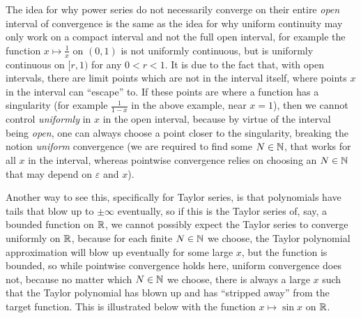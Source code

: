 \documentclass[../analysis1.tex]{subfiles}
\begin{document}
\begin{remark}
    The idea for why power series do not necessarily converge on their entire \textit{open} interval of convergence is the same as the idea for why uniform continuity may only work on a compact interval and not the full open interval, for example the function $x\mapsto \frac{1}{x}$ on $(0,1)$ is not uniformly continuous, but is uniformly continuous on $[r,1)$ for any $0<r<1$. It is due to the fact that, with open intervals, there are limit points which are not in the interval itself, where points $x$ in the interval can ``escape'' to. If these points are where a function has a singularity (for example $\frac{1}{1-x}$ in the above example, near $x=1$), then we cannot control \textit{uniformly} in $x$ in the open interval, because by virtue of the interval being \textit{open}, one can always choose a point closer to the singularity, breaking the notion \textit{uniform} convergence (we are required to find some $N\in\mathbb{N}$, that works for all $x$ in the interval, whereas pointwise convergence relies on choosing an $N\in\mathbb{N}$ that may depend on $\varepsilon$ and $x$).

    Another way to see this, specifically for Taylor series, is that polynomials have tails that blow up to $\pm \infty$ eventually, so if this is the Taylor series of, say, a bounded function on $\mathbb{R}$, we cannot possibly expect the Taylor series to converge uniformly on $\mathbb{R}$, because for each finite $N\in\mathbb{N}$ we choose, the Taylor polynomial approximation will blow up eventually for some large $x$, but the function is bounded, so while pointwise convergence holds here, uniform convergence does not, because no matter which $N\in\mathbb{N}$ we choose, there is always a large $x$ such that the Taylor polynomial has blown up and has ``stripped away'' from the target function. This is illustrated below with the function $x\mapsto \sin x$ on $\mathbb{R}$.
\end{remark}

\begin{center}
\end{center}
\end{document}
